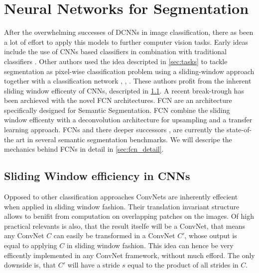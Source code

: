
\section{Neural Networks for Segmentation}\label{sec:fcn}

After the overwhelming successes of \Glspl{DCNN} in image classification, there as been a lot of effort to apply this models to further computer vision tasks. Early ideas include the use of \Glspl{CNN} based classifiers in combination with traditional classifiers \cite{RNN}. Other authors used the idea descripted in \cref{sec:tasks} to tackle segmentation as pixel-wise classification problem using a sliding-window approach together with a classification network \cite{fast_scanning}, \cite{overfeat}, \cite{bktt} \cite{highly}. These authors profit from the inherent sliding window efficenty of \Glspl{CNN}, descripted in \cref{sec:convnet}. A recent break-trough has been archieved with the novel \gls{FCN} \cite{fcn} architectures. \Gls{FCN} are an architecture specifically designed for Semantic Segmentation. \Gls{FCN} combine the sliding window efficenty with a deconvolution architecture for upsampling and a transfer learning approach. \glspl{FCN} and there deeper successors \cite{CRF1}, \cite{deconv1} \cite{googleSeg} are currently the state-of-the art in several semantic segmentation benchmarks. We will descripe the mechanics behind \glspl{FCN} in detail in \cref{sec:fcn_detail}.


\iffalse

As described in \Cref{sec:tasks} Semantic Segmentation can be views as a spatial version of classification, where a classification model can be transfered into a segmentation model using a sliding window approach. In \glspl{CNN} sliding window can be carried out very efficiently. Most CNN based segmentation approaches are using this insight to build models on the shoulders of AlexNet and its deeper successors. 

\fi

\subsection{Sliding Window efficiency in CNNs} \label{sec:convnet}

Opposed to other classification approaches ConvNets are inherently effecient when applied in sliding window fashion. Their translation invariant structure allows to benifit from computation on overlapping patches on the images. Of high practical relevants is also, that the result itselfe will be a ConvNet, that means any ConvNet $C$ can easily be transformed in a ConvNet $C'$, whose output is equal to applying $C$ in sliding window fashion. This idea can hence be very efficently implemented in any ConvNet framework, without much efford. The only downside is, that $C'$ will have a stride $s$ equal to the product of all strides in $C$.

